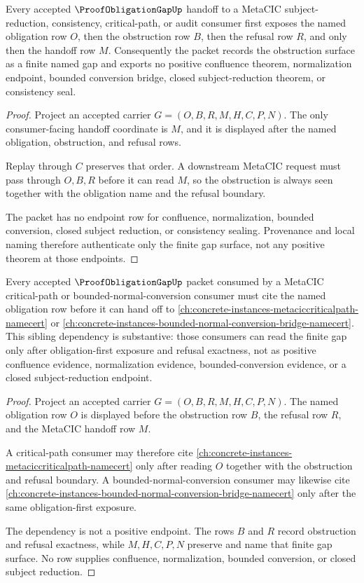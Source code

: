 \begin{theorem}
\label{thm:proof-obligation-gap-metacic-handoff}
Every accepted $\ProofObligationGapUp$ handoff to a MetaCIC subject-reduction, consistency, critical-path, or audit consumer first exposes the named obligation row $O$, then the obstruction row $B$, then the refusal row $R$, and only then the handoff row $M$. Consequently the packet records the obstruction surface as a finite named gap and exports no positive confluence theorem, normalization endpoint, bounded conversion bridge, closed subject-reduction theorem, or consistency seal.
\end{theorem}
\begin{proof}
Project an accepted carrier $G=(O,B,R,M,H,C,P,N)$. The only consumer-facing handoff coordinate is $M$, and it is displayed after the named obligation, obstruction, and refusal rows.

Replay through $C$ preserves that order. A downstream MetaCIC request must pass through $O,B,R$ before it can read $M$, so the obstruction is always seen together with the obligation name and the refusal boundary.

The packet has no endpoint row for confluence, normalization, bounded conversion, closed subject reduction, or consistency sealing. Provenance and local naming therefore authenticate only the finite gap surface, not any positive theorem at those endpoints.
\end{proof}

\begin{theorem}
\label{thm:proof-obligation-gap-metacic-sibling-dependency}
Every accepted $\ProofObligationGapUp$ packet consumed by a MetaCIC critical-path or bounded-normal-conversion consumer must cite the named obligation row before it can hand off to \autoref{ch:concrete-instances-metaciccriticalpath-namecert} or \autoref{ch:concrete-instances-bounded-normal-conversion-bridge-namecert}. This sibling dependency is substantive: those consumers can read the finite gap only after obligation-first exposure and refusal exactness, not as positive confluence evidence, normalization evidence, bounded-conversion evidence, or a closed subject-reduction endpoint.
\end{theorem}
\begin{proof}
Project an accepted carrier $G=(O,B,R,M,H,C,P,N)$. The named obligation row $O$ is displayed before the obstruction row $B$, the refusal row $R$, and the MetaCIC handoff row $M$.

A critical-path consumer may therefore cite \autoref{ch:concrete-instances-metaciccriticalpath-namecert} only after reading $O$ together with the obstruction and refusal boundary. A bounded-normal-conversion consumer may likewise cite \autoref{ch:concrete-instances-bounded-normal-conversion-bridge-namecert} only after the same obligation-first exposure.

The dependency is not a positive endpoint. The rows $B$ and $R$ record obstruction and refusal exactness, while $M,H,C,P,N$ preserve and name that finite gap surface. No row supplies confluence, normalization, bounded conversion, or closed subject reduction.
\end{proof}

